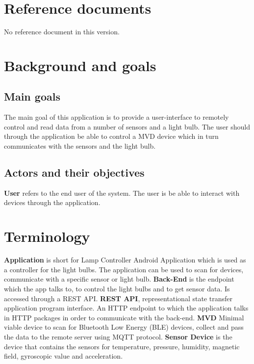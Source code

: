 \documentclass[a4paper]{article}
\begin{document}
\section{Reference documents}
No reference document in this version.
\section{Background and goals}
\subsection{Main goals}
The main goal of this application is to provide a user-interface to remotely control and read data from a number of sensors and a light bulb. The user should through the application be able to control a MVD device which in turn communicates with the sensors and the light bulb.
\subsection{Actors and their objectives}

\textbf{User} refers to the end user of the system. The user is be able to interact with devices through the application. 

\section{Terminology}

\textbf{Application} is short for Lamp Controller Android Application which is used as a controller for the light bulbs. The application can be used to scan for devices, communicate with a specific sensor or light bulb. 
\newline \newline
\textbf{Back-End} is the endpoint which the app talks to, to control the light bulbs and to get sensor data. Is accessed through a REST API. 
\newline \newline
\textbf{REST API}, representational state transfer application program interface. An HTTP endpoint to which the application talks in HTTP packages in order to communicate with the back-end. 
\newline \newline
\textbf{MVD} Minimal viable device to scan for Bluetooth Low Energy (BLE) devices, collect and pass the data to the remote server using MQTT protocol.
\newline \newline
\textbf{Sensor Device} is the device that contains the sensors for temperature, pressure, humidity, magnetic field, gyroscopic value and acceleration.
\end{document}
